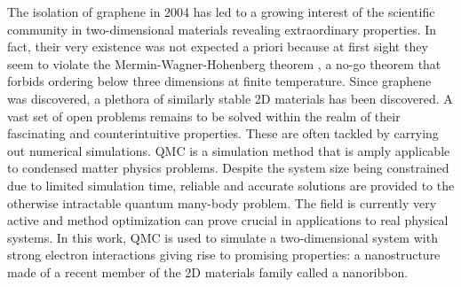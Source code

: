 
\label{cap:int}

\slshape

The isolation of graphene in 2004 has led to a growing interest of the scientific community in two-dimensional materials revealing extraordinary properties.
In fact, their very existence was not expected a priori because at first sight they seem to violate the Mermin-Wagner-Hohenberg theorem \cite{mermin_absence_1966, coleman_there_1973, hohenberg_existence_1967}, a no-go theorem that forbids ordering below three dimensions at finite temperature.
Since graphene was discovered, a plethora of similarly stable \ac{2D} materials has been discovered.
A vast set of open problems remains to be solved within the realm of their fascinating and counterintuitive properties. These are often tackled by carrying out numerical simulations. \ac{QMC} is a simulation method that is amply applicable to condensed matter physics problems. Despite the system size being constrained due to limited simulation time, reliable and accurate solutions are provided to the otherwise intractable quantum many-body problem. The field is currently very active and method optimization can prove crucial in applications to real physical systems. In this work, \acs{QMC} is used to simulate a two-dimensional system with strong electron interactions giving rise to promising properties: a nanostructure made of a recent member of the \acs{2D} materials family called a nanoribbon.

\normalfont







\cleardoublepage